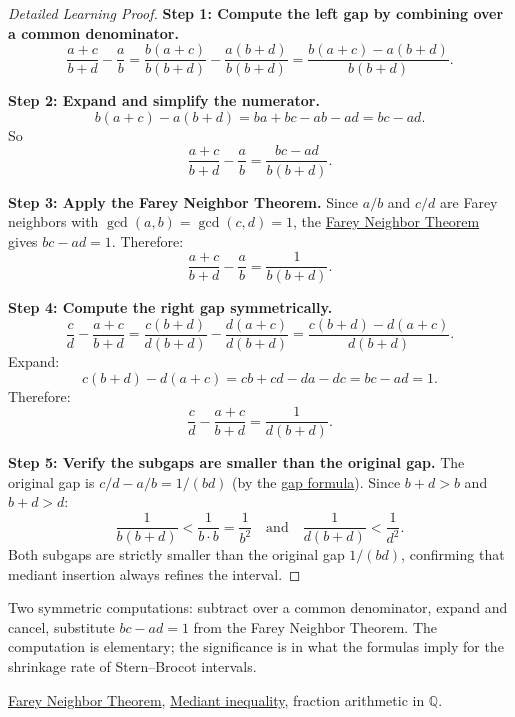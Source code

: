 \begin{proof}[Detailed Learning Proof]
\LRAProofBodyStart
\textbf{Step 1: Compute the left gap by combining over a common denominator.}
\[
\frac{a+c}{b+d} - \frac{a}{b}
= \frac{b(a+c)}{b(b+d)} - \frac{a(b+d)}{b(b+d)}
= \frac{b(a+c) - a(b+d)}{b(b+d)}.
\]

\textbf{Step 2: Expand and simplify the numerator.}
\[
b(a+c) - a(b+d)
= ba + bc - ab - ad
= bc - ad.
\]
So
\[
\frac{a+c}{b+d} - \frac{a}{b} = \frac{bc - ad}{b(b+d)}.
\]

\textbf{Step 3: Apply the Farey Neighbor Theorem.}
Since $a/b$ and $c/d$ are Farey neighbors with $\gcd(a,b) = \gcd(c,d) = 1$,
the \hyperref[thm:farey-neighbor-theorem]{Farey Neighbor Theorem} gives
$bc - ad = 1$.  Therefore:
\[
\frac{a+c}{b+d} - \frac{a}{b} = \frac{1}{b(b+d)}.
\]

\textbf{Step 4: Compute the right gap symmetrically.}
\[
\frac{c}{d} - \frac{a+c}{b+d}
= \frac{c(b+d)}{d(b+d)} - \frac{d(a+c)}{d(b+d)}
= \frac{c(b+d) - d(a+c)}{d(b+d)}.
\]
Expand:
\[
c(b+d) - d(a+c)
= cb + cd - da - dc
= bc - ad = 1.
\]
Therefore:
\[
\frac{c}{d} - \frac{a+c}{b+d} = \frac{1}{d(b+d)}.
\]

\textbf{Step 5: Verify the subgaps are smaller than the original gap.}
The original gap is $c/d - a/b = 1/(bd)$ (by the
\hyperref[thm:farey-gap]{gap formula}).
Since $b + d > b$ and $b + d > d$:
\[
\frac{1}{b(b+d)} < \frac{1}{b \cdot b} = \frac{1}{b^2}
\quad\text{and}\quad
\frac{1}{d(b+d)} < \frac{1}{d^2}.
\]
Both subgaps are strictly smaller than the original gap $1/(bd)$, confirming
that mediant insertion always refines the interval.
\end{proof}

\begin{remark*}
Two symmetric computations: subtract over a common denominator, expand and
cancel, substitute $bc - ad = 1$ from the Farey Neighbor Theorem.  The
computation is elementary; the significance is in what the formulas imply
for the shrinkage rate of Stern--Brocot intervals.
\end{remark*}

\begin{dependencies}
\hyperref[thm:farey-neighbor-theorem]{Farey Neighbor Theorem},
\hyperref[thm:mediant-inequality]{Mediant inequality},
fraction arithmetic in $\mathbb{Q}$.
\end{dependencies}

\clearpage
